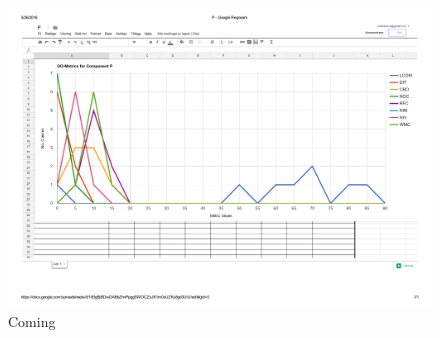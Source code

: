 \begin{landscape}
\setlength\LTleft{-.5in}
	\begin{figure}
	\label{fig:procgraph}
	\caption{Coming}
	\centering
	\includegraphics[width=\textwidth]{images/process.pdf}
	\end{figure}
\end{landscape}



